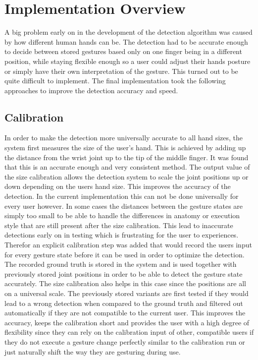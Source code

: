 \chapter{Implementation Overview}
\label{cha:ImplementationOverview}
A big problem early on in the development of the detection algorithm was caused by how different human hands can be. The detection had to be accurate enough to decide between stored gestures based only on one finger being in a different position, while staying flexible enough so a user could adjust their hands posture or simply have their own interpretation of the gesture. This turned out to be quite difficult to implement. The final implementation took the following approaches to improve the detection accuracy and speed.

\section{Calibration}
In order to make the detection more universally accurate to all hand sizes, the system first measures the size of the user's hand. This is achieved by adding up the distance from the wrist joint up to the tip of the middle finger. It was found that this is an accurate enough and very consistent method. The output value of the size calibration allows the detection system to scale the joint positions up or down depending on the users hand size. This improves the accuracy of the detection. In the current implementation this can not be done universally for every user however. In some cases the distances between the gesture states are simply too small to be able to handle the differences in anatomy or execution style that are still present after the size calibration. This lead to inaccurate detections early on in testing which is frustrating for the user to experiences. Therefor an explicit calibration step was added that would record the users input for every gesture state before it can be used in order to optimize the detection. The recorded ground truth is stored in the system and is used together with previously stored joint positions in order to be able to detect the gesture state accurately. The size calibration also helps in this case since the positions are all on a universal scale. The previously stored variants are first tested if they would lead to a wrong detection when compared to the ground truth and filtered out automatically if they are not compatible to the current user. This improves the accuracy, keeps the calibration short and provides the user with a high degree of flexibility since they can rely on the calibration input of other, compatible users if they do not execute a gesture change perfectly similar to the calibration run or just naturally shift the way they are gesturing during use.

